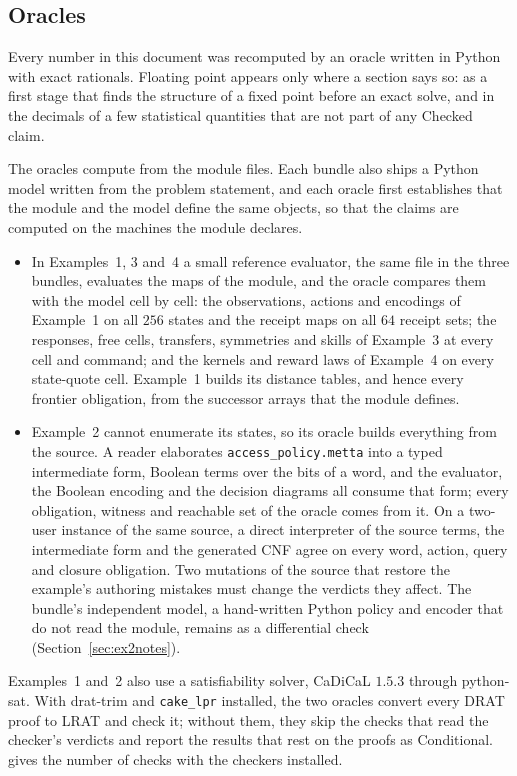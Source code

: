 \documentclass[11pt]{article}
\newcommand{\fpath}[1]{\nolinkurl{#1}}
\newcommand{\code}[1]{\texttt{#1}}
\theoremstyle{definition}
\theoremstyle{plain}
\begin{document}
\subsection{Oracles}\label{sec:oracles}

Every number in this document was recomputed by an oracle written in Python with exact rationals.
Floating point appears only where a section says so: as a first stage that finds the structure of
a fixed point before an exact solve, and in the decimals of a few statistical quantities that are
not part of any Checked claim.

The oracles compute from the module files. Each bundle also ships a Python model written from the
problem statement, and each oracle first establishes that the module and the model define the same
objects, so that the claims are computed on the machines the module declares.
\begin{itemize}
\item In Examples~1, 3 and~4 a small reference evaluator, the same file in the three bundles,
evaluates the maps of the module, and the oracle compares them with the model cell by cell: the
observations, actions and encodings of Example~1 on all $256$ states and the receipt maps on all
$64$ receipt sets; the responses, free cells, transfers, symmetries and skills of Example~3 at every
cell and command; and the kernels and reward laws of Example~4 on every state-quote cell. Example~1
builds its distance tables, and hence every frontier obligation, from the successor arrays that the
module defines.
\item Example~2 cannot enumerate its states, so its oracle builds everything from the source. A
reader elaborates \fpath{access_policy.metta} into a typed intermediate form, Boolean terms over the
bits of a word, and the evaluator, the Boolean encoding and the decision diagrams all consume that
form; every obligation, witness and reachable set of the oracle comes from it. On a two-user
instance of the same source, a direct interpreter of the source terms, the intermediate form and the
generated CNF agree on every word, action, query and closure obligation. Two mutations of the source
that restore the example's authoring mistakes must change the verdicts they affect. The bundle's
independent model, a hand-written Python policy and encoder that do not read the module, remains as
a differential check (Section~\ref{sec:ex2notes}).
\end{itemize}
Examples~1 and~2 also use a satisfiability solver, CaDiCaL $1.5.3$ through python-sat. With drat-trim
and \code{cake\_lpr} installed, the two oracles convert every DRAT proof to LRAT and check it;
without them, they skip the checks that read the checker's verdicts and report the results that
rest on the proofs as Conditional.  gives the number of checks with the
checkers installed.
\end{document}

